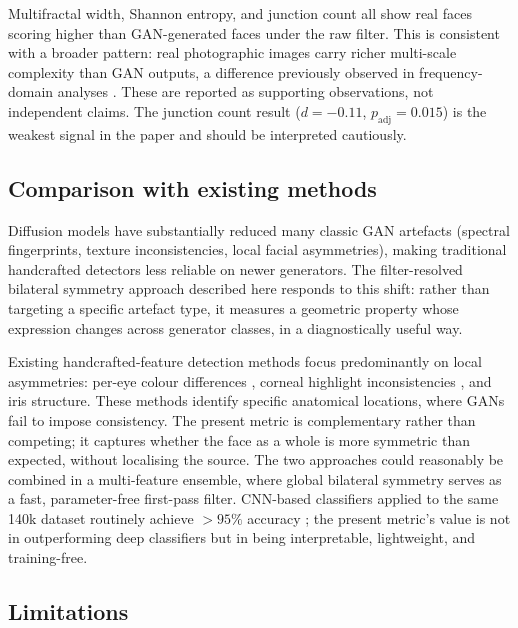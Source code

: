 \documentclass[11pt,a4paper]{article}
\begin{document}
Multifractal width, Shannon entropy, and junction count all show real faces
scoring higher than GAN-generated faces under the raw filter. This is consistent
with a broader pattern: real photographic images carry richer multi-scale
complexity than GAN outputs, a difference previously observed in frequency-domain
analyses \citep{shannon1948, chhabra1989}. These are reported as supporting
observations, not independent claims. The junction count result ($d = -0.11$,
$p_\text{adj} = 0.015$) is the weakest signal in the paper and should be
interpreted cautiously.

\subsection{Comparison with existing methods}

Diffusion models have substantially reduced many classic GAN artefacts (spectral
fingerprints, texture inconsistencies, local facial asymmetries), making
traditional handcrafted detectors less reliable on newer generators. The
filter-resolved bilateral symmetry approach described here responds to this
shift: rather than targeting a specific artefact type, it measures a geometric
property whose expression changes across generator classes, in a diagnostically
useful way.

Existing handcrafted-feature detection methods focus predominantly on local
asymmetries: per-eye colour differences \citep{matern2019exploiting}, corneal
highlight inconsistencies \citep{hu2021exposing}, and iris structure. These
methods identify specific anatomical locations, where GANs fail to impose
consistency. The present metric is complementary rather than competing; it
captures whether the face as a whole is more symmetric than expected, without
localising the source. The two approaches could reasonably be combined in a
multi-feature ensemble, where global bilateral symmetry serves as a fast,
parameter-free first-pass filter. CNN-based classifiers applied to the same 140k
dataset routinely achieve $>95\%$ accuracy \citep{tolosana2022survey}; the
present metric's value is not in outperforming deep classifiers but in being
interpretable, lightweight, and training-free.

\subsection{Limitations}
\end{document}
